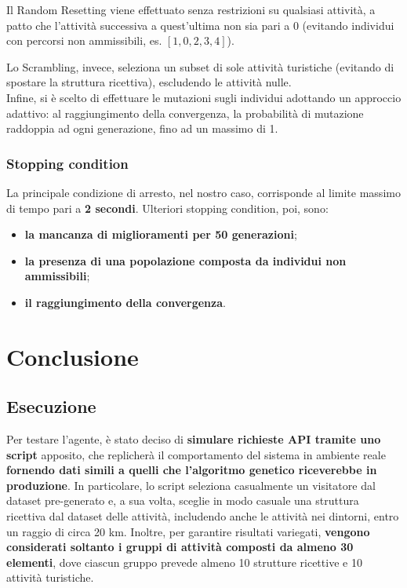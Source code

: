 \documentclass{CSUniSchoolLabReport}
\begin{document}
Il Random Resetting viene effettuato senza restrizioni su qualsiasi attività, a patto che l'attività successiva a quest'ultima non sia pari a 0 (evitando individui con percorsi non ammissibili, es. $[1, 0, 2, 3, 4]$).

Lo Scrambling, invece, seleziona un subset di sole attività turistiche (evitando di spostare la struttura ricettiva), escludendo le attività nulle. \\

Infine, si è scelto di effettuare le mutazioni sugli individui adottando un approccio adattivo: al raggiungimento della convergenza, la probabilità di mutazione raddoppia ad ogni generazione, fino ad un massimo di 1.

\subsubsection{Stopping condition}

La principale condizione di arresto, nel nostro caso, corrisponde al limite massimo di tempo pari a \textbf{2 secondi}.
Ulteriori stopping condition, poi, sono:
\begin{itemize}
	\item \textbf{la mancanza di miglioramenti per 50 generazioni};
	\item \textbf{la presenza di una popolazione composta da individui non ammissibili};
	\item \textbf{il raggiungimento della convergenza}.
\end{itemize}

\pagebreak{}

\section{Conclusione}
\subsection{Esecuzione}

Per testare l'agente, è stato deciso di \textbf{simulare richieste API tramite uno script} apposito, che replicherà il comportamento del sistema in ambiente reale \textbf{fornendo dati simili a quelli che l'algoritmo genetico riceverebbe in produzione}. In particolare, lo script seleziona casualmente un visitatore dal dataset pre-generato e, a sua volta, sceglie in modo casuale una struttura ricettiva dal dataset delle attività, includendo anche le attività nei dintorni, entro un raggio di circa 20 km. Inoltre, per garantire risultati variegati, \textbf{vengono considerati soltanto i gruppi di attività composti da almeno 30 elementi}, dove ciascun gruppo prevede almeno 10 strutture ricettive e 10 attività turistiche.
\end{document}
